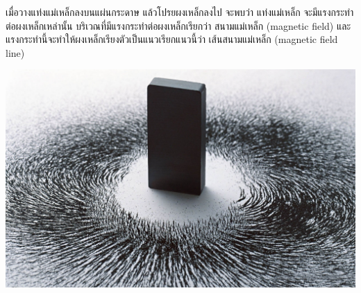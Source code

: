 \begin{minipage}{.5\textwidth}
เมื่อวางแท่งแม่เหล็กลงบนแผ่นกระดาษ  แล้วโปรยผงเหล็กลงไป  จะพบว่า  แท่งแม่เหล็ก \hfill จะมีแรงกระทำต่อผงเหล็กเหล่านั้น  บริเวณที่มีแรงกระทำต่อผงเหล็กเรียกว่า \hfill {\color{red} สนามแม่เหล็ก (magnetic  field)}  \hfill      และแรงกระทำนี้จะทำให้ผงเหล็กเรียงตัวเป็นแนวเรียกแนวนี้ว่า {\color{red} \hfill เส้นสนามแม่เหล็ก  (magnetic  field  line)}
\end{minipage} \hfill
\begin{adjustbox}{valign=c} 
    \begin{minipage}[c]{.45\linewidth}
        \includegraphics[width=\linewidth]{lesson2-1-1.jpg}
    \end{minipage}
\end{adjustbox}
